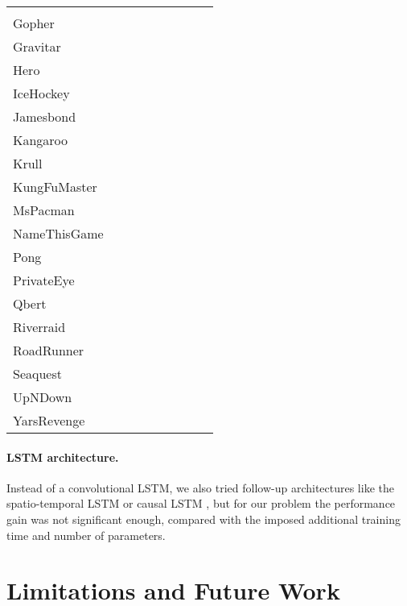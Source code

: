 \documentclass{article}
\begin{document}
\begin{table*}[t]
{\begin{tabular}{lrlrlrlrl}
    &  & 
    &  &  \\
    Gopher
    &  & 
    &  & 
    &  & 
    &  &  \\
    Gravitar
    &  & 
    &  & 
    &  & 
    &  &  \\
    Hero
    &  & 
    &  & 
    &  & 
    &  &  \\
    IceHockey
    &  & 
    &  & 
    &  & 
    &  &  \\
    Jamesbond
    &  & 
    &  & 
    &  & 
    &  &  \\
    Kangaroo
    &  & 
    &  & 
    &  & 
    &  &  \\
    Krull
    &  & 
    &  & 
    &  & 
    &  &  \\
    KungFuMaster
    &  & 
    &  & 
    &  & 
    &  &  \\
    MsPacman
    &  & 
    &  & 
    &  & 
    &  &  \\
    NameThisGame
    &  & 
    &  & 
    &  & 
    &  &  \\
    Pong
    &  & 
    &  & 
    &  & 
    &  &  \\
    PrivateEye
    &  & 
    &  & 
    &  & 
    &  &  \\
    Qbert
    &  & 
    &  & 
    &  & 
    &  &  \\
    Riverraid
    &  & 
    &  & 
    &  & 
    &  &  \\
    RoadRunner
    &  & 
    &  & 
    &  & 
    &  &  \\
    Seaquest
    &  & 
    &  & 
    &  & 
    &  &  \\
    UpNDown
    &  & 
    &  & 
    &  & 
    &  &  \\
    YarsRevenge
    &  & 
    &  & 
    &  & 
    &  &  \\
    \bottomrule
  \end{tabular}
  }
  \vskip -0.1in
\end{table*}

\clearpage


\paragraph{LSTM architecture.}
Instead of a convolutional LSTM, we also tried follow-up architectures like the
spatio-temporal LSTM \citep{st-lstm} or causal LSTM \citep{causal-lstm}, but
for our problem the performance gain was not significant enough, compared with
the imposed additional training time and number of parameters.


\section{Limitations and Future Work}
\end{document}
